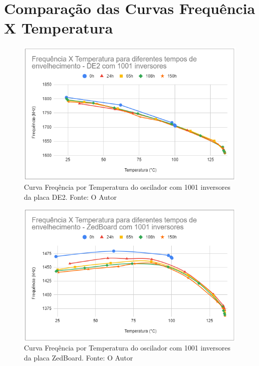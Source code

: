 \section{Comparação das Curvas Frequência X Temperatura}

\begin{figure}[H]
    \centering
    \includegraphics[scale=0.75]{figures/Resultados/FreqXTempDE21001}
    \caption{Curva Freqência por Temperatura do oscilador com 1001 inversores da placa DE2. Fonte: O Autor}
    \label{fig:FreqXTempDE21001}
\end{figure}

\begin{figure}[H]
    \centering
    \includegraphics[scale=0.75]{figures/Resultados/FreqXTempZedBoard1001}
    \caption{Curva Freqência por Temperatura do oscilador com 1001 inversores da placa ZedBoard. Fonte: O Autor}
    \label{fig:FreqXTempZedBoard1001}
\end{figure}